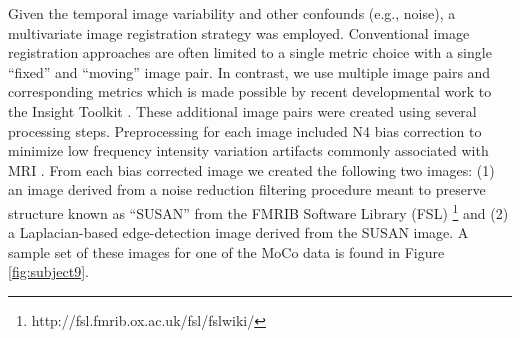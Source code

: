 \documentclass{llncs}
\begin{document}
Given the temporal image variability and other confounds (e.g., noise), 
a multivariate image registration strategy was employed.  Conventional
image registration approaches are often limited to a single metric choice
with a single ``fixed'' and ``moving'' image pair.  In contrast, we 
use multiple image
pairs and corresponding metrics which is made possible by recent 
developmental work to the Insight Toolkit \cite{avants2014}.  
These additional image pairs were created using several processing steps.
Preprocessing for each image included N4 bias correction to minimize low frequency
intensity variation artifacts commonly associated with MRI \cite{tustison2010}.  From each
bias corrected image we created the following two images:  (1) an image derived
from a noise reduction filtering procedure meant to preserve structure 
\cite{smith1997} known as ``SUSAN'' from the FMRIB Software Library (FSL)%
\footnote{
http://fsl.fmrib.ox.ac.uk/fsl/fslwiki/
}
and (2) a Laplacian-based edge-detection image
derived from the SUSAN image.  A sample set of these images for one of the MoCo
data is found in Figure \ref{fig:subject9}.
\end{document}
